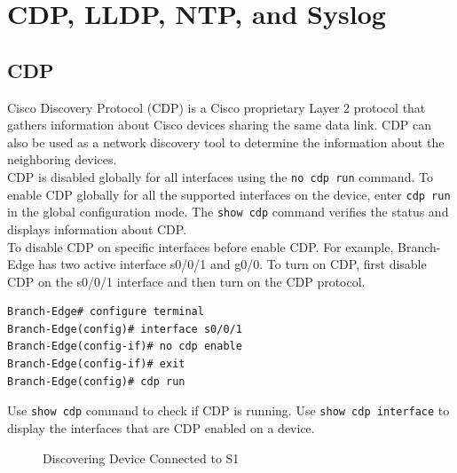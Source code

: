 \chapter{CDP, LLDP, NTP, and Syslog}

\section{CDP}

Cisco Discovery Protocol (CDP) is a Cisco proprietary Layer 2 protocol that gathers information about Cisco devices sharing the same data link. CDP can also be used as a network discovery tool to determine the information about the neighboring devices. \\

CDP is disabled globally for all interfaces using the \verb|no cdp run| command. To enable CDP globally for all the supported interfaces on the device, enter \verb|cdp run| in the global configuration mode. The \verb|show cdp| command verifies the status and displays information about CDP.\\

To disable CDP on specific interfaces before enable CDP. For example, Branch-Edge has two active interface s0/0/1 and g0/0. To turn on CDP, first disable CDP on the s0/0/1 interface and then turn on the CDP protocol.

\begin{verbatim}
Branch-Edge# configure terminal
Branch-Edge(config)# interface s0/0/1
Branch-Edge(config-if)# no cdp enable
Branch-Edge(config-if)# exit
Branch-Edge(config)# cdp run
\end{verbatim}

Use \verb|show cdp| command to check if CDP is running. Use \verb|show cdp interface| to display the interfaces that are CDP enabled on a device. \\

\begin{figure}[hbtp]
\caption{Discovering Device Connected to S1}\label{CDP}
\centering
{}
\end{figure}

